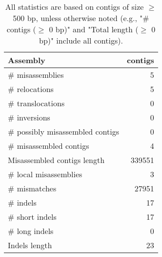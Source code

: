 \documentclass[12pt,a4paper]{article}
\begin{document}
\begin{table}[ht]
\begin{center}
\caption{All statistics are based on contigs of size $\geq$ 500 bp, unless otherwise noted (e.g., "\# contigs ($\geq$ 0 bp)" and "Total length ($\geq$ 0 bp)" include all contigs).}
\begin{tabular}{|l*{1}{|r}|}
\hline
Assembly & contigs \\ \hline
\# misassemblies & 5 \\ \hline
\hspace{5mm}\# relocations & 5 \\ \hline
\hspace{5mm}\# translocations & 0 \\ \hline
\hspace{5mm}\# inversions & 0 \\ \hline
\# possibly misassembled contigs & 0 \\ \hline
\# misassembled contigs & 4 \\ \hline
Misassembled contigs length & 339551 \\ \hline
\# local misassemblies & 3 \\ \hline
\# mismatches & 27951 \\ \hline
\# indels & 17 \\ \hline
\hspace{5mm}\# short indels & 17 \\ \hline
\hspace{5mm}\# long indels & 0 \\ \hline
Indels length & 23 \\ \hline
\end{tabular}
\end{center}
\end{table}
\end{document}
